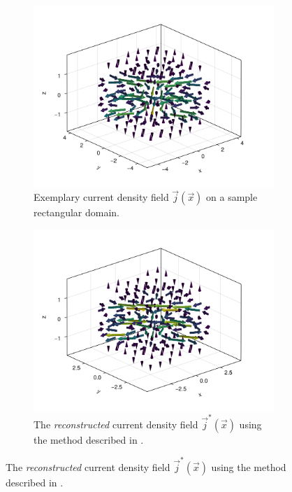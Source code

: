 \documentclass[12pt]{article}
\begin{document}
  \begin{figure}[H]
    \centering
    \begin{subfigure}[t]{0.48\textwidth}
      \centering
      \includegraphics[width=\textwidth]{../figures/cdpr-j-field.pdf}
      \caption{Exemplary current density field $\vec{j}(\vec{x})$ on a sample rectangular domain.}
      \label{fig:cdpr-j-field}
    \end{subfigure}
    \hfill
    \begin{subfigure}[t]{0.48\textwidth}
      \centering
      \includegraphics[width=\textwidth]{../figures/cdprr-j-field.pdf}
      \caption{The \textit{reconstructed} current density field $\vec{j}^*(\vec{x})$ using the method described in .}
      \label{fig:cdprr-j-field}
    \end{subfigure}
  \end{figure}
\end{document}
